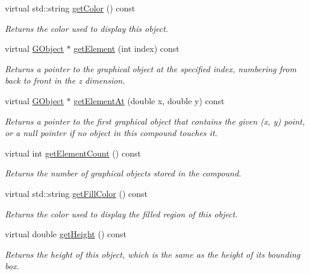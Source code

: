 \begin{DoxyCompactItemize}
virtual std\+::string \mbox{\hyperlink{classsgl_1_1GObject_aa061dfa488c31e18549d64363c1d0e34}{get\+Color}} () const
\begin{DoxyCompactList}\small\item\em Returns the color used to display this object. \end{DoxyCompactList}\item 
virtual \mbox{\hyperlink{classsgl_1_1GObject}{G\+Object}} $\ast$ \mbox{\hyperlink{classsgl_1_1GCompound_abde388cc529d22bb5f7f4a54d56049d8}{get\+Element}} (int index) const
\begin{DoxyCompactList}\small\item\em Returns a pointer to the graphical object at the specified index, numbering from back to front in the {\itshape z} dimension. \end{DoxyCompactList}\item 
virtual \mbox{\hyperlink{classsgl_1_1GObject}{G\+Object}} $\ast$ \mbox{\hyperlink{classsgl_1_1GCompound_a25efa999eca5790ec26ef091b05f961c}{get\+Element\+At}} (double x, double y) const
\begin{DoxyCompactList}\small\item\em Returns a pointer to the first graphical object that contains the given (x, y) point, or a null pointer if no object in this compound touches it. \end{DoxyCompactList}\item 
virtual int \mbox{\hyperlink{classsgl_1_1GCompound_adf7d37ec315f859648def92e6b32408f}{get\+Element\+Count}} () const
\begin{DoxyCompactList}\small\item\em Returns the number of graphical objects stored in the compound. \end{DoxyCompactList}\item 
virtual std\+::string \mbox{\hyperlink{classsgl_1_1GObject_a76f6964a11fde7c78e9751be184e1a3c}{get\+Fill\+Color}} () const
\begin{DoxyCompactList}\small\item\em Returns the color used to display the filled region of this object. \end{DoxyCompactList}\item 
virtual double \mbox{\hyperlink{classsgl_1_1GObject_a1e7e353362434072875264cf95629f99}{get\+Height}} () const
\begin{DoxyCompactList}\small\item\em Returns the height of this object, which is the same as the height of its bounding box. \end{DoxyCompactList}\item 

\end{DoxyCompactItemize}
